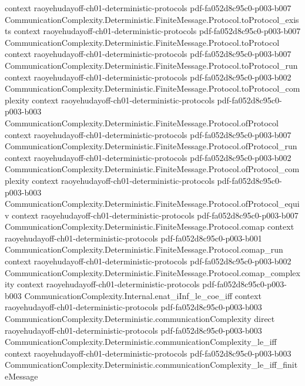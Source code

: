 \begin{theorem}
  {context}
  {raoyehudayoff-ch01-deterministic-protocols}
  {pdf-fa052d8c95c0-p003-b007}
\proofstep
  {CommunicationComplexity.Deterministic.FiniteMessage.Protocol.toProtocol_exists}
  {context}
  {raoyehudayoff-ch01-deterministic-protocols}
  {pdf-fa052d8c95c0-p003-b007}
\proofstep
  {CommunicationComplexity.Deterministic.FiniteMessage.Protocol.toProtocol}
  {context}
  {raoyehudayoff-ch01-deterministic-protocols}
  {pdf-fa052d8c95c0-p003-b007}
\proofstep
  {CommunicationComplexity.Deterministic.FiniteMessage.Protocol.toProtocol_run}
  {context}
  {raoyehudayoff-ch01-deterministic-protocols}
  {pdf-fa052d8c95c0-p003-b002}
\proofstep
  {CommunicationComplexity.Deterministic.FiniteMessage.Protocol.toProtocol_complexity}
  {context}
  {raoyehudayoff-ch01-deterministic-protocols}
  {pdf-fa052d8c95c0-p003-b003}
\proofstep
  {CommunicationComplexity.Deterministic.FiniteMessage.Protocol.ofProtocol}
  {context}
  {raoyehudayoff-ch01-deterministic-protocols}
  {pdf-fa052d8c95c0-p003-b007}
\proofstep
  {CommunicationComplexity.Deterministic.FiniteMessage.Protocol.ofProtocol_run}
  {context}
  {raoyehudayoff-ch01-deterministic-protocols}
  {pdf-fa052d8c95c0-p003-b002}
\proofstep
  {CommunicationComplexity.Deterministic.FiniteMessage.Protocol.ofProtocol_complexity}
  {context}
  {raoyehudayoff-ch01-deterministic-protocols}
  {pdf-fa052d8c95c0-p003-b003}
\proofstep
  {CommunicationComplexity.Deterministic.FiniteMessage.Protocol.ofProtocol_equiv}
  {context}
  {raoyehudayoff-ch01-deterministic-protocols}
  {pdf-fa052d8c95c0-p003-b007}
\proofstep
  {CommunicationComplexity.Deterministic.FiniteMessage.Protocol.comap}
  {context}
  {raoyehudayoff-ch01-deterministic-protocols}
  {pdf-fa052d8c95c0-p003-b001}
\proofstep
  {CommunicationComplexity.Deterministic.FiniteMessage.Protocol.comap_run}
  {context}
  {raoyehudayoff-ch01-deterministic-protocols}
  {pdf-fa052d8c95c0-p003-b002}
\proofstep
  {CommunicationComplexity.Deterministic.FiniteMessage.Protocol.comap_complexity}
  {context}
  {raoyehudayoff-ch01-deterministic-protocols}
  {pdf-fa052d8c95c0-p003-b003}
\proofstep
  {CommunicationComplexity.Internal.enat_iInf_le_coe_iff}
  {context}
  {raoyehudayoff-ch01-deterministic-protocols}
  {pdf-fa052d8c95c0-p003-b003}
\proofstep
  {CommunicationComplexity.Deterministic.communicationComplexity}
  {direct}
  {raoyehudayoff-ch01-deterministic-protocols}
  {pdf-fa052d8c95c0-p003-b003}
\proofstep
  {CommunicationComplexity.Deterministic.communicationComplexity_le_iff}
  {context}
  {raoyehudayoff-ch01-deterministic-protocols}
  {pdf-fa052d8c95c0-p003-b003}
\proofstep
  {CommunicationComplexity.Deterministic.communicationComplexity_le_iff_finiteMessage}

\end{theorem}
